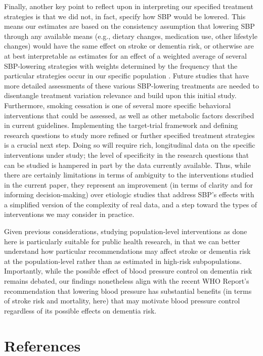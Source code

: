 \documentclass[
]{book}
\begin{document}
Finally, another key point to reflect upon in interpreting our specified treatment strategies is that we did not, in fact, specify how SBP would be lowered. This means our estimates are based on the consistency assumption that lowering SBP through any available means (e.g., dietary changes, medication use, other lifestyle changes) would have the same effect on stroke or dementia risk, or otherwise are at best interpretable as estimates for an effect of a weighted average of several SBP-lowering strategies with weights determined by the frequency that the particular strategies occur in our specific population \autocite{waterkills,hernan2011}. Future studies that have more detailed assessments of these various SBP-lowering treatments are needed to disentangle treatment variation relevance and build upon this initial study. Furthermore, smoking cessation is one of several more specific behavioral interventions that could be assessed, as well as other metabolic factors described in current guidelines\autocite{johnson2019,lancet2020}. Implementing the target-trial framework and defining research questions to study more refined or further specified treatment strategies is a crucial next step. Doing so will require rich, longitudinal data on the specific interventions under study; the level of specificity in the research questions that can be studied is hampered in part by the data currently available. Thus, while there are certainly limitations in terms of ambiguity to the interventions studied in the current paper, they represent an improvement (in terms of clarity and for informing decision-making) over etiologic studies that address SBP's effects with a simplified version of the complexity of real data, and a step toward the types of interventions we may consider in practice.

Given previous considerations, studying population-level interventions as done here is particularly suitable for public health research, in that we can better understand how particular recommendations may affect stroke or dementia risk at the population-level rather than as estimated in high-risk subpopulations. Importantly, while the possible effect of blood pressure control on dementia risk remains debated, our findings nonetheless align with the recent WHO Report's recommendation that lowering blood pressure has substantial benefits (in terms of stroke risk and mortality, here) that may motivate blood pressure control regardless of its possible effects on dementia risk\autocite{who_dementia2019}.

\hypertarget{references-1}{%
\section{References}\label{references-1}}
\end{document}
